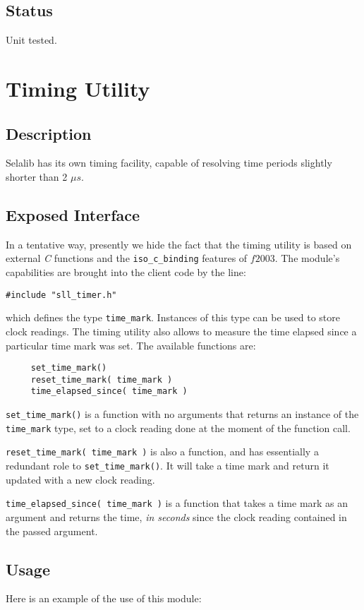 \documentclass[]{report}   %
\begin{document}
\subsection{Status}
Unit tested.

\section{Timing Utility}
\subsection{Description}
Selalib has its own timing facility, capable of resolving time periods slightly shorter than 2 $\mu s$. 

\subsection{Exposed Interface}

In a tentative way, presently we hide the fact that the timing utility is based on external \emph{C} functions and the \verb+iso_c_binding+ features of $f2003$. The module's capabilities are brought into the client code by the line:
\begin{verbatim}
#include "sll_timer.h"
\end{verbatim}
which defines the type \verb+time_mark+. Instances of this type can be used to store clock readings. The timing utility also allows to measure the time elapsed since a particular time mark was set. The available functions are:

\begin{verbatim}
     set_time_mark()
     reset_time_mark( time_mark )
     time_elapsed_since( time_mark )
\end{verbatim}

\verb+set_time_mark()+ is a function with no arguments that returns an instance of the \verb+time_mark+ type, set to a clock reading done at the moment of the function call.

\verb+reset_time_mark( time_mark )+ is also a function, and has essentially a redundant role to \verb+set_time_mark()+. It will take a time mark and return it updated with a new clock reading.

\verb+time_elapsed_since( time_mark )+ is a function that takes a time mark as an argument and returns the time, \emph{in seconds} since the clock reading contained in the passed argument.

\subsection{Usage}
Here is an example of the use of this module:
\end{document}
